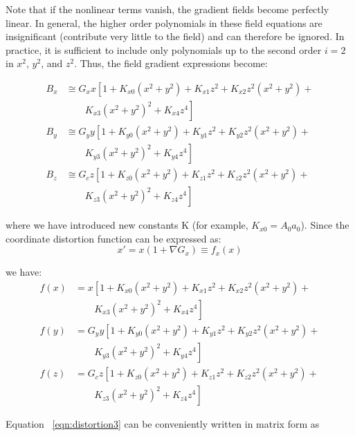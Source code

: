 Note that if the nonlinear terms vanish, the gradient fields become perfectly linear. In general, the higher order polynomials in these field equations are insignificant (contribute very little to the field) and can therefore be ignored. In practice, it is sufficient to include only polynomials up to the second order $i = 2$ in $x^2$, $y^2$, and $z^2$. Thus, the field gradient expressions become:

\begin{align}
  B_x &\cong G_x x \left[ 1 + K_{x0}(x^2 + y^2) + K_{x1}z^2 + K_{x2}z^2(x^2 + y^2) + \right. \nonumber \\
      &\qquad \left. K_{x3}(x^2 + y^2)^2 + K_{x4}z^4 \right] \nonumber \\
  B_y &\cong G_y y \left[ 1 + K_{y0}(x^2 + y^2) + K_{y1}z^2 + K_{y2}z^2(x^2 + y^2) + \right. \nonumber \\
      &\qquad \left. K_{y3}(x^2 + y^2)^2 + K_{y4}z^4 \right] \label{eqn:distortion2}\\
  B_z &\cong G_c z \left[ 1 + K_{z0}(x^2 + y^2) + K_{z1}z^2 + K_{z2}z^2(x^2 + y^2) + \right. \nonumber \\
      &\qquad \left. K_{z3}(x^2 + y^2)^2 + K_{z4}z^4 \right] \nonumber
\end{align}

where we have introduced new constants K (for example, $K_{x0} = A_0 a_0$). Since the coordinate distortion function can be expressed as:
\begin{equation}
  x' = x(1 + \nabla G_x) \equiv f_x(x)
\end{equation}

we have: 
\begin{align}
  f(x) &= x \left[ 1 + K_{x0}(x^2 + y^2) + K_{x1}z^2 + K_{x2}z^2(x^2 + y^2) + \right. \nonumber \\
  &\qquad \left. K_{x3}(x^2 + y^2)^2 + K_{x4}z^4 \right] \nonumber \\
  f(y) &= G_y y \left[ 1 + K_{y0}(x^2 + y^2) + K_{y1}z^2 + K_{y2}z^2(x^2 + y^2) + \right. \nonumber \\
      &\qquad \left. K_{y3}(x^2 + y^2)^2 + K_{y4}z^4 \right] \label{eqn:distortion3} \\
  f(z) &= G_c z \left[ 1 + K_{z0}(x^2 + y^2) + K_{z1}z^2 + K_{z2}z^2(x^2 + y^2) + \right. \nonumber \\
      &\qquad \left. K_{z3}(x^2 + y^2)^2 + K_{z4}z^4 \right] \nonumber
\end{align}

Equation ~\ref{eqn:distortion3} can be conveniently written in matrix form as

